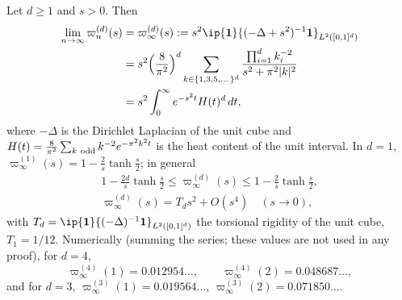 \begin{theorem}[the limit $n\to\infty$ at fixed $s=n\mu$]\label{ffs:thm:limit}
Let $d\ge1$ and $s>0$. Then
\begin{align*}
\lim_{n\to\infty}\varpi_n^{(d)}(s)&=\varpi_\infty^{(d)}(s):=s^2\ip{\mathbf 1}
{(-\Delta+s^2)^{-1}\mathbf 1}_{L^2([0,1]^d)}\\
&=s^2\Bigl(\frac8{\pi^2}\Bigr)^d\sum_{k\in\{1,3,5,\dots\}^d}\frac{\prod_{i=1}^d
k_i^{-2}}{s^2+\pi^2\lvert k\rvert^2}\\
&=s^2\int_0^\infty e^{-s^2t}H(t)^d\,dt,
\end{align*}
where $-\Delta$ is the Dirichlet Laplacian of the unit cube and $H(t)=\frac8
{\pi^2}\sum_{k\ \rm odd}k^{-2}e^{-\pi^2k^2t}$ is the heat content of the unit
interval. In $d=1$, $\varpi_\infty^{(1)}(s)=1-\frac2s\tanh\frac s2$; in
general
\begin{gather*}
1-\frac{2d}s\tanh\frac s2\le\varpi_\infty^{(d)}(s)\le1-\frac2s\tanh\frac s2,
\\
\varpi_\infty^{(d)}(s)=T_ds^2+O(s^4)\quad(s\to0),
\end{gather*}
with $T_d=\ip{\mathbf 1}{(-\Delta)^{-1}\mathbf 1}_{L^2([0,1]^d)}$ the torsional
rigidity of the unit cube, $T_1=1/12$. Numerically \textup{(}summing the series; these values are not used in any proof\textup{)}, for $d=4$,
\[
\varpi_\infty^{(4)}(1)=0.012954\ldots,\qquad\varpi_\infty^{(4)}(2)=0.048687
\ldots,
\]
and for $d=3$, $\varpi_\infty^{(3)}(1)=0.019564\ldots$, $\varpi_\infty^{(3)}(2)
=0.071850\ldots$.
\end{theorem}

